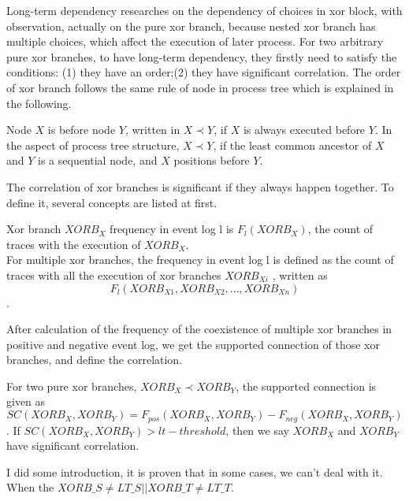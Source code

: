Long-term dependency researches on the dependency of choices in xor block, with observation, actually on the pure xor branch, because nested xor branch has multiple choices, which affect the execution of later process. For two arbitrary pure xor branches, to have long-term dependency, they firstly need to satisfy the conditions: (1) they have an order;(2) they have significant correlation.
The order of xor branch follows the same rule of node in process tree which is explained in the following.
\begin{definition}
	Node $X$ is before node $Y$, written in $X \prec Y$, if $X$ is always executed before $Y$.  In the aspect of process tree structure, $X \prec Y$, if the least common ancestor of $X$ and $Y$ is a sequential node, and $X$ positions before $Y$.
\end{definition} 
The correlation of xor branches is significant if they always happen together. To define it, several concepts are listed at first. 
\begin{definition}
	Xor branch $XORB_X$ frequency in event log l is $F_{l}(XORB_X)$, the count of traces with the execution of $XORB_X$. \\
	For multiple xor branches, the frequency in event log l is defined as the count of traces with all the execution of xor branches $XORB_{Xi}$ , written as \[F_{l}(XORB_{X1}, XORB_{X2},...,XORB_{Xn})\].
\end{definition}
After calculation of the frequency of the coexistence of multiple xor branches in positive and negative event log, we get the supported connection of those xor branches, and define the correlation. 
\begin{definition}
	\label{def: supported-connection}
	For two pure xor branches, $XORB_X \prec XORB_Y$, the supported connection is given as \[SC(XORB_X,XORB_Y)= F_{pos}(XORB_X, XORB_Y) -F_{neg}(XORB_X, XORB_Y)\]. If $SC(XORB_X,XORB_Y) > lt-threshold$, then we say $XORB_X$ and $XORB_Y$ have significant correlation.
\end{definition}

I did some introduction, it is proven that in some cases, we can't deal with it. When the $XORB\_S \neq LT\_S || XORB\_T \neq LT\_T$.

